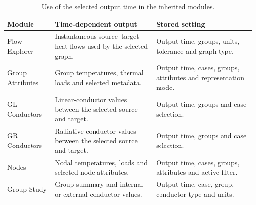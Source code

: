 \begin{table}[H]
    \centering
    \caption{Use of the selected output time in the inherited modules.}
    \label{tab:appendix_time_dependent_modules}
    \small
    \renewcommand{\arraystretch}{1.13}
    \setlength{\tabcolsep}{3pt}
    \begin{tabularx}{\textwidth}{|>{\raggedright\arraybackslash}p{}|>{\raggedright\arraybackslash}X|>{\raggedright\arraybackslash}X|}
        \hline
        \textbf{Module} & \textbf{Time-dependent output} & \textbf{Stored setting} \\
        \hline
        Flow Explorer &
        Instantaneous source--target heat flows used by the selected graph. &
        Output time, groups, units, tolerance and graph type. \\
        \hline
        Group Attributes &
        Group temperatures, thermal loads and selected metadata. &
        Output time, cases, groups, attributes and representation mode. \\
        \hline
        GL Conductors &
        Linear-conductor values between the selected source and target. &
        Output time, groups and case selection. \\
        \hline
        GR Conductors &
        Radiative-conductor values between the selected source and target. &
        Output time, groups and case selection. \\
        \hline
        Nodes &
        Nodal temperatures, loads and selected node attributes. &
        Output time, cases, groups, attributes and active filter. \\
        \hline
        Group Study &
        Group summary and internal or external conductor values. &
        Output time, case, group, conductor type and units. \\
        \hline
    \end{tabularx}
\end{table}
